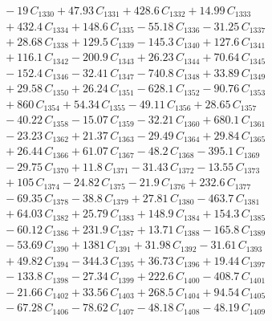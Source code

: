 \documentclass[a4paper,11pt]{article}
\begin{document}
\begin{align}
&\quad - 19\,C_{1330} + 47.93\,C_{1331} + 428.6\,C_{1332} + 14.99\,C_{1333} \nonumber\\
&\quad + 432.4\,C_{1334} + 148.6\,C_{1335} - 55.18\,C_{1336} - 31.25\,C_{1337} \nonumber\\
&\quad + 28.68\,C_{1338} + 129.5\,C_{1339} - 145.3\,C_{1340} + 127.6\,C_{1341} \nonumber\\
&\quad + 116.1\,C_{1342} - 200.9\,C_{1343} + 26.23\,C_{1344} + 70.64\,C_{1345} \nonumber\\
&\quad - 152.4\,C_{1346} - 32.41\,C_{1347} - 740.8\,C_{1348} + 33.89\,C_{1349} \nonumber\\
&\quad + 29.58\,C_{1350} + 26.24\,C_{1351} - 628.1\,C_{1352} - 90.76\,C_{1353} \nonumber\\
&\quad + 860\,C_{1354} + 54.34\,C_{1355} - 49.11\,C_{1356} + 28.65\,C_{1357} \nonumber\\
&\quad - 40.22\,C_{1358} - 15.07\,C_{1359} - 32.21\,C_{1360} + 680.1\,C_{1361} \nonumber\\
&\quad - 23.23\,C_{1362} + 21.37\,C_{1363} - 29.49\,C_{1364} + 29.84\,C_{1365} \nonumber\\
&\quad + 26.44\,C_{1366} + 61.07\,C_{1367} - 48.2\,C_{1368} - 395.1\,C_{1369} \nonumber\\
&\quad - 29.75\,C_{1370} + 11.8\,C_{1371} - 31.43\,C_{1372} - 13.55\,C_{1373} \nonumber\\
&\quad + 105\,C_{1374} - 24.82\,C_{1375} - 21.9\,C_{1376} + 232.6\,C_{1377} \nonumber\\
&\quad - 69.35\,C_{1378} - 38.8\,C_{1379} + 27.81\,C_{1380} - 463.7\,C_{1381} \nonumber\\
&\quad + 64.03\,C_{1382} + 25.79\,C_{1383} + 148.9\,C_{1384} + 154.3\,C_{1385} \nonumber\\
&\quad - 60.12\,C_{1386} + 231.9\,C_{1387} + 13.71\,C_{1388} - 165.8\,C_{1389} \nonumber\\
&\quad - 53.69\,C_{1390} + 1381\,C_{1391} + 31.98\,C_{1392} - 31.61\,C_{1393} \nonumber\\
&\quad + 49.82\,C_{1394} - 344.3\,C_{1395} + 36.73\,C_{1396} + 19.44\,C_{1397} \nonumber\\
&\quad - 133.8\,C_{1398} - 27.34\,C_{1399} + 222.6\,C_{1400} - 408.7\,C_{1401} \nonumber\\
&\quad - 21.66\,C_{1402} + 33.56\,C_{1403} + 268.5\,C_{1404} + 94.54\,C_{1405} \nonumber\\
&\quad - 67.28\,C_{1406} - 78.62\,C_{1407} - 48.18\,C_{1408} - 48.19\,C_{1409} \nonumber\\

\end{align}
\end{document}
